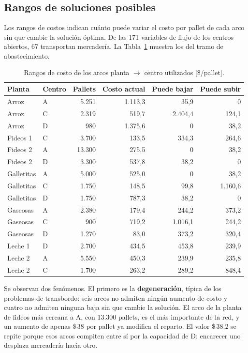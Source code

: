 \documentclass[10pt,a4paper]{article}
\begin{document}
\subsection{Rangos de soluciones posibles}
\label{sec:b2}

Los rangos de costos indican cuánto puede variar el costo por pallet de cada
arco sin que cambie la solución óptima. De las 171 variables de flujo de los centros abiertos, 67
transportan mercadería. La Tabla~\ref{tab:rangos_costos} muestra los del
tramo de abastecimiento.

\begin{table}[H]
\centering\small
\caption{Rangos de costo de los arcos planta $\to$ centro utilizados [\$/pallet].}
\label{tab:rangos_costos}
\begin{tabular}{llrrrr}
\toprule
\textbf{Planta} & \textbf{Centro} & \textbf{Pallets} & \textbf{Costo actual} & \textbf{Puede bajar} & \textbf{Puede subir} \\
\midrule
Arroz       & A & 5.251  & 1.113,3 & 35,9 & 0 \\
Arroz       & C & 2.319  & 519,7 & 2.404,4 & 124,1 \\
Arroz       & D & 980    & 1.375,6 & 0 & 38,2 \\
Fideos 1    & C & 3.700  & 133,5 & 334,3 & 264,6 \\
Fideos 2    & A & 13.300 & 275,5 & 0 & 38,2 \\
Fideos 2    & D & 3.300  & 537,8 & 38,2 & 0 \\
Galletitas  & A & 5.000  & 525,0 & 0 & 38,2 \\
Galletitas  & C & 1.750  & 148,5 & 99,8 & 1.160,6 \\
Galletitas  & D & 1.750  & 787,3 & 38,2 & 0 \\
Gaseosas    & A & 2.380  & 179,4 & 244,2 & 373,2 \\
Gaseosas    & C & 900    & 719,2 & 1.016,1 & 244,2 \\
Gaseosas    & D & 1.270  & 83,0 & 373,2 & 320,4 \\
Leche 1     & D & 2.700  & 434,5 & 453,8 & 239,9 \\
Leche 2     & A & 5.550  & 450,3 & 239,9 & 235,8 \\
Leche 2     & C & 1.700  & 263,2 & 289,2 & 848,4 \\
\bottomrule
\end{tabular}
\end{table}

Se observan dos fenómenos. El primero es la \textbf{degeneración}, típica de
los problemas de transbordo: seis arcos no admiten ningún aumento de costo y
cuatro no admiten ninguna baja sin que cambie la solución. El arco de la planta
de fideos más cercana a A, con 13.300 pallets, es el más importante de la red,
y un aumento de apenas \$\,38 por pallet ya modifica el reparto. El valor
\$\,38,2 se repite porque esos arcos compiten entre sí por la capacidad de D:
encarecer uno desplaza mercadería hacia otro.
\end{document}
